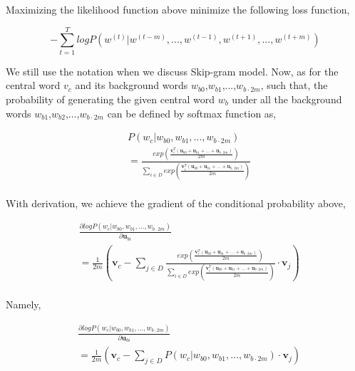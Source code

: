 \documentclass[10pt, conference, compsocconf]{IEEEtran}
\begin{document}
Maximizing the likelihood function above minimize the following loss function,

\begin{equation}
-\sum_{t=1}^{T}logP(w^{(t)}\big|w^{(t-m)},...,w^{(t-1)},w^{(t+1)},...,w^{(t+m)})
\end{equation}

We still use the notation when we discuss Skip-gram model. Now, as for the central word $v_{c}$ and its background words $w_{b0}$,$w_{b1}$,...,$w_{b\cdot 2m}$, such that, the probability of generating the given central word $w_{b}$ under all the background words $w_{b1}$,$w_{b2}$,...,$w_{b\cdot 2m}$ can be defined by softmax function as,

\begin{equation}
\begin{aligned}
& P(w_{c}\big|w_{b0},w_{b1},...,w_{b\cdot 2m}) \\
& = \frac {exp( \frac{\textbf{v}_{c}^{T}(\textbf{u}_{b0}+\textbf{u}_{b1}+...+\textbf{u}_{b\cdot 2m})}{2m})} {\sum_{i\in D}exp(\frac{\textbf{v}_{i}^{T}(\textbf{u}_{b0}+\textbf{u}_{b1}+...+\textbf{u}_{b\cdot 2m})}{2m}) } \\
\end{aligned}
\end{equation}

With derivation, we achieve the gradient of the conditional probability above,

\begin{equation}
\begin{aligned}
& \frac{\partial logP(w_{c}\big|w_{b0},w_{b1},...,w_{b\cdot 2m})}{\partial \textbf{u}_{bi}} \\
& =\frac{1}{2m} (\textbf{v}_{c}-\sum_{j\in D} \frac{exp( \frac{\textbf{v}_{c}^{T}(\textbf{u}_{b0}+\textbf{u}_{b1}+...+\textbf{u}_{b\cdot 2m})}{2m})} {\sum_{i\in D}exp(\frac{\textbf{v}_{i}^{T}(\textbf{u}_{b0}+\textbf{u}_{b1}+...+\textbf{u}_{b\cdot 2m})}{2m}) }\cdot \textbf{v}_{j}) \\
\end{aligned}
\end{equation}

Namely,

\begin{equation}
\begin{aligned}
& \frac{\partial logP(w_{c}\big|w_{b0},w_{b1},...,w_{b\cdot 2m})}{\partial \textbf{u}_{bi}} \\
& = \frac{1}{2m} (\textbf{v}_{c}-\sum_{j\in D} P(w_{c}\big|w_{b0},w_{b1},...,w_{b\cdot 2m})\cdot \textbf{v}_{j}) \\
\end{aligned}
\end{equation}
\end{document}
